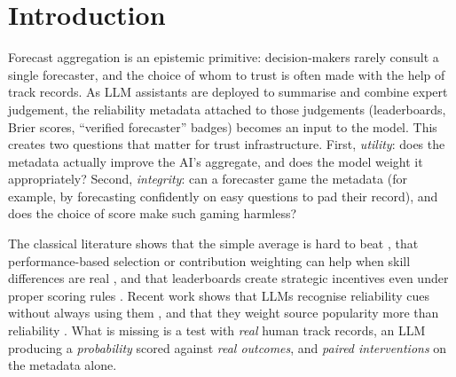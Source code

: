 \documentclass[11pt,letterpaper]{article}
\begin{document}
\section{Introduction}
Forecast aggregation is an epistemic primitive: decision-makers rarely consult a single forecaster, and the
choice of whom to trust is often made with the help of track records. As LLM assistants are deployed to
summarise and combine expert judgement, the reliability metadata attached to those judgements (leaderboards, Brier
scores, ``verified forecaster'' badges) becomes an input to the model. This creates two questions that matter for
trust infrastructure. First, \emph{utility}: does the metadata actually improve the AI's aggregate, and does the model
weight it appropriately? Second, \emph{integrity}: can a forecaster game the metadata (for example, by
forecasting confidently on easy questions to pad their record), and does the choice of score make such gaming
harmless?

The classical literature shows that the simple average is hard to beat \citep{clemen1989}, that performance-based
selection or contribution weighting can help when skill differences are real \citep{budescu2015,mannes2014}, and that
leaderboards create strategic incentives even under proper scoring rules \citep{witkowski2018}. Recent work shows that
LLMs recognise reliability cues without always using them \citep{zhang2026}, and that they weight source popularity more
than reliability \citep{ashkinaze2026}. What is missing is a test with \emph{real} human track records, an LLM producing a
\emph{probability} scored against \emph{real outcomes}, and \emph{paired interventions} on the metadata alone.
\end{document}
